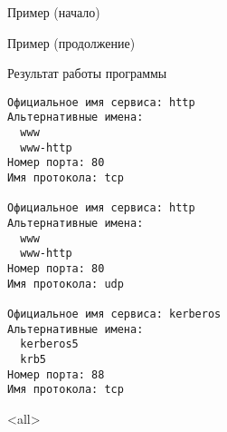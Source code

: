 \begin{frame}[fragile]{Пример (начало)}
\tiny
\end{frame}

\begin{frame}[fragile]{Пример (продолжение)}
\tiny
\end{frame}

\begin{frame}[fragile]{Результат работы программы}
\scriptsize\begin{verbatim}
Официальное имя сервиса: http
Альтернативные имена:
  www
  www-http
Номер порта: 80
Имя протокола: tcp

Официальное имя сервиса: http
Альтернативные имена:
  www
  www-http
Номер порта: 80
Имя протокола: udp

Официальное имя сервиса: kerberos
Альтернативные имена:
  kerberos5
  krb5
Номер порта: 88
Имя протокола: tcp
\end{verbatim}
\end{frame}


\mode<all>{}


